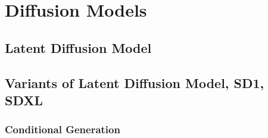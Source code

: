 \chapter{Diffusion Models}
\label{chap:diffusion}

% 
\section{Latent Diffusion Model}

\section{Variants of Latent Diffusion Model, SD1, SDXL}
\subsection{Conditional Generation}